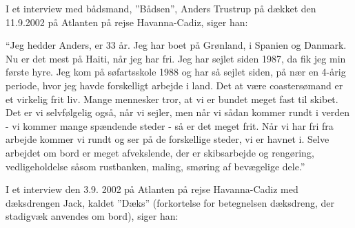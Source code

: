 I et interview med bådsmand, ''Bådsen'', Anders Trustrup på dækket den
11.9.2002 på Atlanten på rejse Havanna-Cadiz, siger han:

``Jeg hedder
Anders, er 33 år. Jeg har boet på Grønland, i Spanien og Danmark. Nu er
det mest på Haiti, når jeg har fri. Jeg har sejlet siden 1987, da fik
jeg min første hyre. Jeg kom på søfartsskole 1988 og har så sejlet
siden, på nær en 4-årig periode, hvor jeg havde forskelligt arbejde i
land. Det at være coastersømand er et virkelig frit liv. Mange mennesker
tror, at vi er bundet meget fast til skibet. Det er vi selvfølgelig
også, når vi sejler, men når vi sådan kommer rundt i verden - vi kommer
mange spændende steder - så er det meget frit. Når vi har fri fra
arbejde kommer vi rundt og ser på de forskellige steder, vi er havnet i.
Selve arbejdet om bord er meget afvekslende, der er skibsarbejde og
rengøring, vedligeholdelse såsom rustbanken, maling, smøring af
bevægelige dele.''

I et interview den 3.9. 2002 på Atlanten på rejse
Havanna-Cadiz med dæksdrengen Jack, kaldet ''Dæks'' (forkortelse for
betegnelsen dæksdreng, der stadigvæk anvendes om bord), siger han: 

